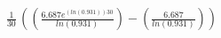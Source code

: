 \documentclass[preview]{standalone}
\begin{document}
\begin{align*}
\frac{1}{30}\,((\frac{6.687e^{(ln(0.931))30}}{ln(0.931)})-(\frac{6.687}{ln(0.931)}))
\end{align*}
\end{document}
